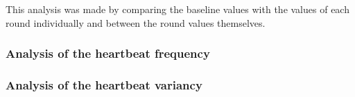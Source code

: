 This analysis was made by comparing the baseline values with the values of each round individually and between the round values themselves.

\subsubsection{Analysis of the heartbeat frequency}



%
%
\subsubsection{Analysis of the heartbeat variancy}
%
